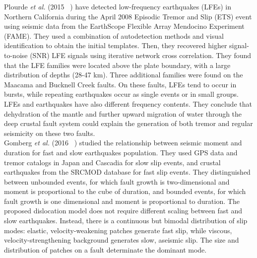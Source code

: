 \documentclass[main.tex]{subfiles}
\begin{document}
Plourde \textit{et al.} (2015 ~\cite{PLO_2015}) have detected low-frequency earthquakes (LFEs) in Northern California during the April 2008 Episodic Tremor and Slip (ETS) event using seismic data from the EarthScope Flexible Array Mendocino Experiment (FAME). They used a combination of autodetection methods and visual identification to obtain the initial templates. Then, they recovered higher signal-to-noise (SNR) LFE signals using iterative network cross correlation. They found that the LFE families were located above the plate boundary, with a large distribution of depths (28-47 km). Three additional families were found on the Maacama and Bucknell Creek faults. On these faults, LFEs tend to occur in bursts, while repeating earthquakes occur as single events or in small groups. LFEs and earthquakes have also different frequency contents. They conclude that dehydration of the mantle and further upward migration of water through the deep crustal fault system could explain the generation of both tremor and regular seismicity on these two faults. \\

Gomberg \textit{et al.} (2016 ~\cite{GOM_2016_GRL}) studied the relationship between seismic moment and duration for fast and slow earthquakes population. They used GPS data and tremor catalogs in Japan and Cascadia for slow slip events, and crustal earthquakes from the SRCMOD database for fast slip events. They distinguished between unbounded events, for which fault growth is two-dimensional and moment is proportional to the cube of duration, and bounded events, for which fault growth is one dimensional and moment is proportional to duration. The proposed dislocation model does not require different scaling between fast and slow earthquakes. Instead, there is a continuous but bimodal distribution of slip modes: elastic, velocity-weakening patches generate fast slip, while viscous, velocity-strengthening background generates slow, aseismic slip. The size and distribution of patches on a fault determinate the dominant mode.
\end{document}
